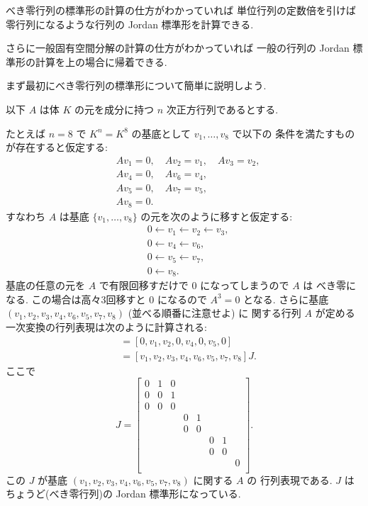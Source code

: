 \documentclass[12pt,twoside]{jarticle}
\begin{document}
べき零行列の標準形の計算の仕方がわかっていれば
単位行列の定数倍を引けば零行列になるような行列の Jordan 標準形を計算できる.

さらに一般固有空間分解の計算の仕方がわかっていれば
一般の行列の Jordan 標準形の計算を上の場合に帰着できる.

まず最初にべき零行列の標準形について簡単に説明しよう.

以下 $A$ は体 $K$ の元を成分に持つ $n$ 次正方行列であるとする.

たとえば $n=8$ で $K^n=K^8$ の基底として $v_1,\ldots,v_8$ で以下の
条件を満たすものが存在すると仮定する:
\begin{align*}
  &
  Av_1=0,\quad Av_2=v_1,\quad Av_3=v_2,
  \\ &
  Av_4=0,\quad Av_6=v_4,
  \\ &
  Av_5=0,\quad Av_7=v_5,
  \\ &
  Av_8=0.
\end{align*}
すなわち $A$ は基底 $\{v_1,\ldots,v_8\}$ の元を次のように移すと仮定する:
\begin{align*}
  &
  0 \leftarrow v_1 \leftarrow v_2 \leftarrow v_3,
  \\ &
  0 \leftarrow v_4 \leftarrow v_6,
  \\ &
  0 \leftarrow v_5 \leftarrow v_7,
  \\ &
  0 \leftarrow v_8.
\end{align*}
基底の任意の元を $A$ で有限回移すだけで $0$ になってしまうので $A$ は
べき零になる. この場合は高々3回移すと $0$ になるので $A^3=0$ となる.
さらに基底 $(v_1,v_2,v_3,v_4,v_6,v_5,v_7,v_8)$ (並べる順番に注意せよ) に
関する行列 $A$ が定める一次変換の行列表現は次のように計算される:
\begin{align*}
  [Av_1,Av_2,Av_3,Av_4,Av_6,Av_5,Av_7,Av_8]
  &=[0,v_1,v_2,0,v_4,0,v_5,0]
  \\
  &=[v_1,v_2,v_3,v_4,v_6,v_5,v_7,v_8]J.
\end{align*}
ここで
\begin{equation*}
  J = 
  \begin{bmatrix}
    0 & 1 & 0 &   &   &   &   &   \\
    0 & 0 & 1 &   &   &   &   &   \\
    0 & 0 & 0 &   &   &   &   &   \\
      &   &   & 0 & 1 &   &   &   \\
      &   &   & 0 & 0 &   &   &   \\
      &   &   &   &   & 0 & 1 &   \\
      &   &   &   &   & 0 & 0 &   \\
      &   &   &   &   &   &   & 0 \\
  \end{bmatrix}.
\end{equation*}
この $J$ が基底 $(v_1,v_2,v_3,v_4,v_6,v_5,v_7,v_8)$ に関する $A$ の
行列表現である. $J$ はちょうど(べき零行列)の Jordan 標準形になっている.
\end{document}
